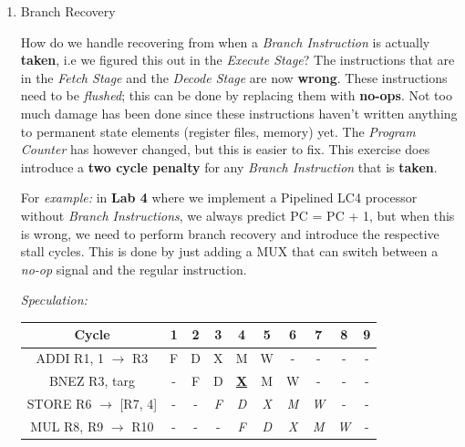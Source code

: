 \documentclass[12pt]{article}
\newenvironment{QandA}{\begin{enumerate}[label=\bfseries\arabic*.]\bfseries}
                      {\end{enumerate}}
\newenvironment{answered}{\par\quad\normalfont}{}
\begin{document}
\begin{QandA}
\begin{answered}
    \textbf{2. During Fetch:}
    
    \textit{How would this work?}
    
    Realistically, we don't really know anything about the instruction during the \textit{Fetch Stage}. But we will design mechanisms that will make this possible.
\end{answered}

\item Branch Recovery
\begin{answered}
    How do we handle recovering from when a \textit{Branch Instruction} is actually \textbf{taken}, i.e we figured this out in the \textit{Execute Stage}? The instructions that are in the \textit{Fetch Stage} and the \textit{Decode Stage} are now \textbf{wrong}. These instructions need to be \textit{flushed}; this can be done by replacing them with \textbf{no-ops}. Not too much damage has been done since these instructions haven't written anything to permanent state elements (register files, memory) yet. The \textit{Program Counter} has however changed, but this is easier to fix. This exercise does introduce a \textbf{two cycle penalty} for any \textit{Branch Instruction} that is \textbf{taken}. 
    
    For \textit{example:} in \textbf{Lab 4} where we implement a Pipelined LC4 processor without \textit{Branch Instructions}, we always predict PC = PC + 1, but when this is wrong, we need to perform branch recovery and introduce the respective stall cycles. This is done by just adding a MUX that can switch between a \textit{no-op} signal and the regular instruction. 
    
    \textit{Speculation:}
    
    \begin{center}
    \begin{tabular}{ |c|c|c|c|c|c|c|c|c|c| } 
     \hline
     Cycle & 1 & 2 & 3 & 4 & 5 & 6 & 7 & 8 & 9\\ 
     \hline
     ADDI R1, 1 $\rightarrow$ R3 & F & D & X & M & W & - & - & - & -\\ 
     BNEZ R3, targ & - & F & D & \textbf{\underline{X}} & M & W & - & - & - \\ 
     STORE R6 $\rightarrow$ [R7, 4] & - & - & \textit{F} & \textit{D} & \textit{X} & \textit{M} & \textit{W} & - & - \\ 
     MUL R8, R9 $\rightarrow$ R10 & - & - & - & \textit{F} & \textit{D} & \textit{X} & \textit{M} & \textit{W} & - \\ 
     \hline
    \end{tabular}
    \end{center}       
    

\end{answered}
\end{QandA}
\end{document}
